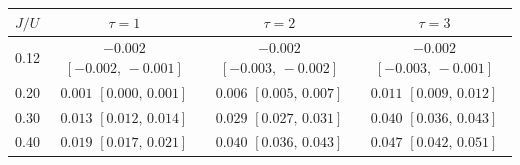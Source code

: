\begin{tabular}{l ccc}
\toprule
$J/U$ & $\tau=1$ & $\tau=2$ & $\tau=3$ \\
\midrule
0.12 & $-0.002$ $[-0.002,\,-0.001]$ & $-0.002$ $[-0.003,\,-0.002]$ & $-0.002$ $[-0.003,\,-0.001]$ \\
0.20 & $0.001$ $[0.000,\,0.001]$ & $0.006$ $[0.005,\,0.007]$ & $0.011$ $[0.009,\,0.012]$ \\
0.30 & $0.013$ $[0.012,\,0.014]$ & $0.029$ $[0.027,\,0.031]$ & $0.040$ $[0.036,\,0.043]$ \\
0.40 & $0.019$ $[0.017,\,0.021]$ & $0.040$ $[0.036,\,0.043]$ & $0.047$ $[0.042,\,0.051]$ \\
\bottomrule
\end{tabular}